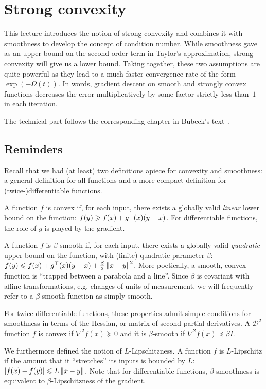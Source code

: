 \section{Strong convexity}

This lecture introduces the notion of strong convexity and combines it
with smoothness to develop the concept of condition number. While smoothness
gave as an upper bound on the second-order term in Taylor's approximation,
strong convexity will give us a lower bound. Taking together, these two
assumptions are quite powerful as they lead to a much faster convergence rate of
the form $\exp(-\Omega(t)).$ In words, gradient descent on smooth and strongly
convex functions decreases the error multiplicatively by some factor strictly
less than~$1$ in each iteration.

The technical part follows the corresponding chapter in Bubeck's
text~\cite{Bubeck}.

\subsection{Reminders}

Recall that we had (at least) two definitions apiece for convexity and
smoothness: a general definition for all functions and a more compact definition
for (twice-)differentiable functions.

A function $f$ is convex if, for each input, there exists a globally valid
\emph{linear} lower bound on the function: $f(y) \geqslant f(x) + g^\top(x)(y-x)$.
For differentiable functions, the role of $g$ is played by the gradient.

A function $f$ is $\beta$-smooth if, for each input, there exists a globally
valid \emph{quadratic} upper bound on the function, with (finite) quadratic
parameter $\beta$: $f(y) \leqslant f(x) + g^\top(x)(y-x) +
\frac{\beta}{2}\left\lVert x-y\right\rVert^2$.  More poetically, a smooth, convex function is
``trapped between a parabola and a line''.  Since $\beta$ is covariant with
affine transformations, e.g. changes of units of measurement, we will frequently
refer to a $\beta$-smooth function as simply smooth.

For twice-differentiable functions, these properties admit simple conditions for
smoothness in terms of the Hessian, or matrix of second partial derivatives.  A
$\mathcal{D}^2$ function $f$ is convex if $\nabla^2f(x) \succeq 0$ and it is
$\beta$-smooth if $\nabla^2f(x) \preceq \beta I$.

We furthermore defined the notion of $L$-Lipschitzness.  A function $f$ is
$L$-Lipschitz if the amount that it ``stretches'' its inputs is bounded by $L$:
$\left\lvert f(x)-f(y)\right\rvert \leqslant L\left\lVert x-y\right\rVert$.  Note that for differentiable functions,
$\beta$-smoothness is equivalent to $\beta$-Lipschitzness of the gradient.

